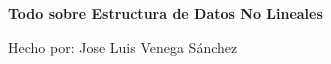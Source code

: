 \thispagestyle{empty}
\begin{center}
\vspace*{\fill}
	\textbf{\huge \vspace*{0.1in}Todo sobre Estructura de Datos No Lineales}
\vspace*{\fill}

\vspace{1in}
Hecho por: Jose Luis Venega Sánchez
\end{center}
